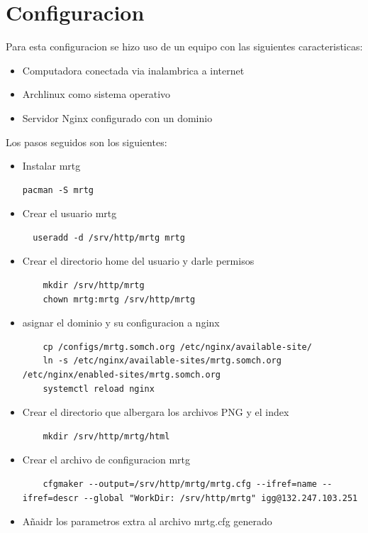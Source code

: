 \documentclass[letterpaper]{article}
\begin{document}
\section{Configuracion}\label{sec:objgen}
Para esta configuracion se hizo uso de un equipo con las siguientes caracteristicas:
\begin{itemize}
  \item Computadora conectada via inalambrica a internet
  \item Archlinux como sistema operativo
  \item Servidor Nginx configurado con un dominio
\end{itemize}
Los pasos seguidos son los siguientes:
\begin{itemize}
  \item Instalar \acrshort{mrtg}\\\begin{lstlisting}
pacman -S mrtg
\end{lstlisting}
  \item Crear el usuario mrtg \\\begin{lstlisting}
  useradd -d /srv/http/mrtg mrtg
\end{lstlisting}
  \item Crear el directorio home del usuario y darle permisos\\
  \begin{lstlisting}
    mkdir /srv/http/mrtg
    chown mrtg:mrtg /srv/http/mrtg
  \end{lstlisting}
  \item asignar el dominio y su configuracion a nginx
  \begin{lstlisting}
    cp /configs/mrtg.somch.org /etc/nginx/available-site/
    ln -s /etc/nginx/available-sites/mrtg.somch.org /etc/nginx/enabled-sites/mrtg.somch.org
    systemctl reload nginx
  \end{lstlisting}
  \item Crear el directorio que albergara los archivos PNG y el index
  \begin{lstlisting}
    mkdir /srv/http/mrtg/html
  \end{lstlisting}
  \item Crear el archivo de configuracion mrtg
  \begin{lstlisting}
    cfgmaker --output=/srv/http/mrtg/mrtg.cfg --ifref=name --ifref=descr --global "WorkDir: /srv/http/mrtg" igg@132.247.103.251
  \end{lstlisting}
  \item Añaidr los parametros extra al archivo mrtg.cfg generado

\end{itemize}
\end{document}
